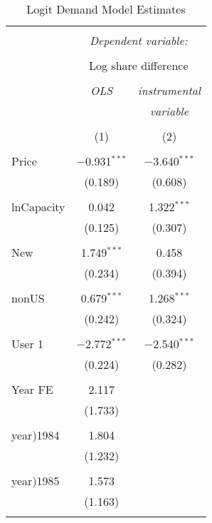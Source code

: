 
\begin{table}[!htbp] \centering 
  \caption{Logit Demand Model Estimates} 
  \label{} 
\begin{tabular}{@{\extracolsep{5pt}}lcc} 
\\[-1.8ex]\hline 
\hline \\[-1.8ex] 
 & \multicolumn{2}{c}{\textit{Dependent variable:}} \\ 
\cline{2-3} 
\\[-1.8ex] & \multicolumn{2}{c}{Log share difference} \\ 
\\[-1.8ex] & \textit{OLS} & \textit{instrumental} \\ 
 & \textit{} & \textit{variable} \\ 
\\[-1.8ex] & (1) & (2)\\ 
\hline \\[-1.8ex] 
 Price & $-$0.931$^{***}$ & $-$3.640$^{***}$ \\ 
  & (0.189) & (0.608) \\ 
  & & \\ 
 lnCapacity & 0.042 & 1.322$^{***}$ \\ 
  & (0.125) & (0.307) \\ 
  & & \\ 
 New & 1.749$^{***}$ & 0.458 \\ 
  & (0.234) & (0.394) \\ 
  & & \\ 
 nonUS & 0.679$^{***}$ & 1.268$^{***}$ \\ 
  & (0.242) & (0.324) \\ 
  & & \\ 
 User 1 & $-$2.772$^{***}$ & $-$2.540$^{***}$ \\ 
  & (0.224) & (0.282) \\ 
  & & \\ 
 Year FE & 2.117 &  \\ 
  & (1.733) &  \\ 
  & & \\ 
 year)1984 & 1.804 &  \\ 
  & (1.232) &  \\ 
  & & \\ 
 year)1985 & 1.573 &  \\ 
  & (1.163) &  \\ 
  & & \\ 

\end{tabular}
\end{table}
